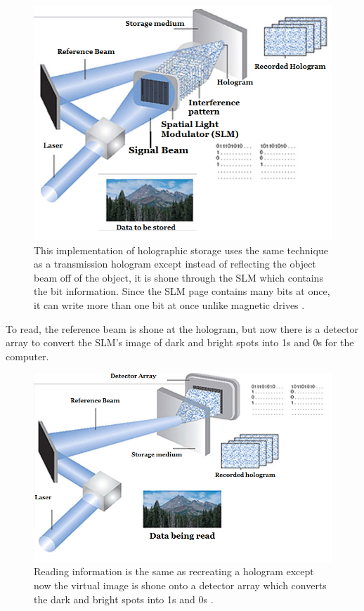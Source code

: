 \documentclass[ notitlepage, numerical, 11pt]{revtex4-1} %
\begin{document}
\begin{figure}[H]
\centerline{\includegraphics[scale=.45]{dataHologramCreate.png}}
\caption{This implementation of holographic storage uses the same technique as a transmission hologram except instead of reflecting the object beam off of the object, it is shone through the SLM which contains the bit information. Since the SLM page contains many bits at once, it can write more than one bit at once unlike magnetic drives  \cite{HDS}.}
\label{dataHologramCreate}
\end{figure} 
To read, the reference beam is shone at the hologram, but now there is a detector array to convert the SLM's image of dark and bright spots into 1s and 0s for the computer.
\begin{figure}[H]
\centerline{\includegraphics[scale=.45]{dataHologramReconstruct.png}}
\caption{Reading information is the same as recreating a hologram except now the virtual image is shone onto a detector array which converts the dark and bright spots into 1s and 0s  \cite{HDS}.}
\label{dataHologramReconstruct}
\end{figure} 
\end{document}
